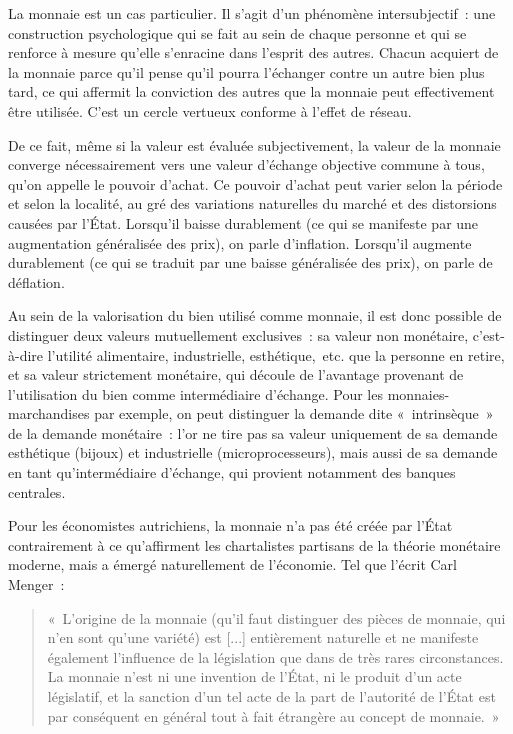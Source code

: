 La monnaie est un cas particulier. Il s'agit d'un phénomène intersubjectif~: une construction psychologique qui se fait au sein de chaque personne et qui se renforce à mesure qu'elle s'enracine dans l'esprit des autres. Chacun acquiert de la monnaie parce qu'il pense qu'il pourra l'échanger contre un autre bien plus tard, ce qui affermit la conviction des autres que la monnaie peut effectivement être utilisée. C'est un cercle vertueux conforme à l'effet de réseau.

De ce fait, même si la valeur est évaluée subjectivement, la valeur de la monnaie converge nécessairement vers une valeur d'échange objective commune à tous, qu'on appelle le pouvoir d'achat. Ce pouvoir d'achat peut varier selon la période et selon la localité, au gré des variations naturelles du marché et des distorsions causées par l'État. Lorsqu'il baisse durablement (ce qui se manifeste par une augmentation généralisée des prix), on parle d'inflation. Lorsqu'il augmente durablement (ce qui se traduit par une baisse généralisée des prix), on parle de déflation.

Au sein de la valorisation du bien utilisé comme monnaie, il est donc possible de distinguer deux valeurs mutuellement exclusives~: sa valeur non monétaire, c'est-à-dire l'utilité alimentaire, industrielle, esthétique,~etc. que la personne en retire, et sa valeur strictement monétaire, qui découle de l'avantage provenant de l'utilisation du bien comme intermédiaire d'échange. Pour les monnaies-marchandises par exemple, on peut distinguer la demande dite «~intrinsèque~» de la demande monétaire~: l'or ne tire pas sa valeur uniquement de sa demande esthétique (bijoux) et industrielle (microprocesseurs), mais aussi de sa demande en tant qu'intermédiaire d'échange, qui provient notamment des banques centrales.


Pour les économistes autrichiens, la monnaie n'a pas été créée par l'État contrairement à ce qu'affirment les chartalistes partisans de la théorie monétaire moderne, mais a émergé naturellement de l'économie. Tel que l'écrit Carl Menger~:

\begin{quote}
«~L'origine de la monnaie (qu'il faut distinguer des pièces de monnaie, qui n'en sont qu'une variété) est [...] entièrement naturelle et ne manifeste également l'influence de la législation que dans de très rares circonstances. La monnaie n'est ni une invention de l'État, ni le produit d'un acte législatif, et la sanction d'un tel acte de la part de l'autorité de l'État est par conséquent en général tout à fait étrangère au concept de monnaie.~»
\end{quote}

